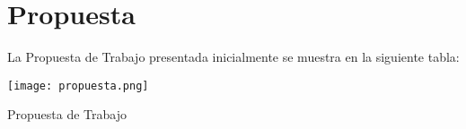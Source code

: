 \section{Propuesta} \label{chapters:propuesta:sections:propuesta}

La Propuesta de Trabajo presentada inicialmente se muestra en la siguiente tabla:

\begin{table}[ht]
    \centerline{\texttt{[image: propuesta.png]}}
    \caption{Propuesta de Trabajo}
    \label{chapters:propuesta:sections:propuesta:table:propuesta}
\end{table}

\clearpage
